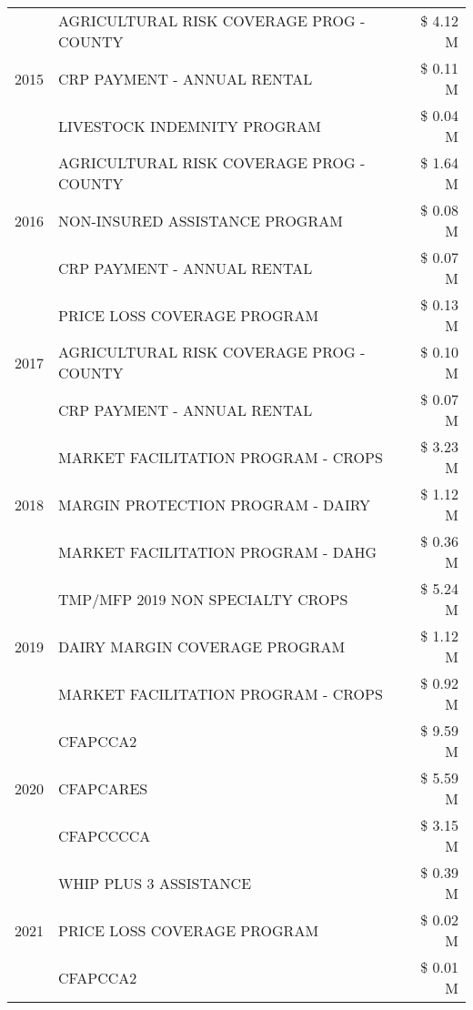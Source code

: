 \begin{tabular}{llr}
\cline{1-3}
\multirow[t]{3}{*}{2015} & AGRICULTURAL RISK COVERAGE PROG - COUNTY & \$ 4.12 M \\
 & CRP PAYMENT - ANNUAL RENTAL & \$ 0.11 M \\
 & LIVESTOCK INDEMNITY PROGRAM & \$ 0.04 M \\
\cline{1-3}
\multirow[t]{3}{*}{2016} & AGRICULTURAL RISK COVERAGE PROG - COUNTY & \$ 1.64 M \\
 & NON-INSURED ASSISTANCE PROGRAM & \$ 0.08 M \\
 & CRP PAYMENT - ANNUAL RENTAL & \$ 0.07 M \\
\cline{1-3}
\multirow[t]{3}{*}{2017} & PRICE LOSS COVERAGE PROGRAM & \$ 0.13 M \\
 & AGRICULTURAL RISK COVERAGE PROG - COUNTY & \$ 0.10 M \\
 & CRP PAYMENT - ANNUAL RENTAL & \$ 0.07 M \\
\cline{1-3}
\multirow[t]{3}{*}{2018} & MARKET FACILITATION PROGRAM - CROPS & \$ 3.23 M \\
 & MARGIN PROTECTION PROGRAM - DAIRY & \$ 1.12 M \\
 & MARKET FACILITATION PROGRAM - DAHG & \$ 0.36 M \\
\cline{1-3}
\multirow[t]{3}{*}{2019} & TMP/MFP 2019 NON SPECIALTY CROPS & \$ 5.24 M \\
 & DAIRY MARGIN COVERAGE PROGRAM & \$ 1.12 M \\
 & MARKET FACILITATION PROGRAM - CROPS & \$ 0.92 M \\
\cline{1-3}
\multirow[t]{3}{*}{2020} & CFAPCCA2 & \$ 9.59 M \\
 & CFAPCARES & \$ 5.59 M \\
 & CFAPCCCCA & \$ 3.15 M \\
\cline{1-3}
\multirow[t]{3}{*}{2021} & WHIP PLUS 3 ASSISTANCE & \$ 0.39 M \\
 & PRICE LOSS COVERAGE PROGRAM & \$ 0.02 M \\
 & CFAPCCA2 & \$ 0.01 M \\
\cline{1-3}
\bottomrule
\end{tabular}
